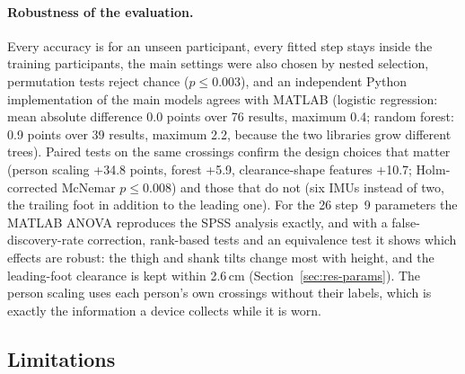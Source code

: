 \paragraph{Robustness of the evaluation.} Every accuracy is for an unseen participant, every fitted step stays inside the training
participants, the main settings were also chosen by nested selection, permutation tests reject chance ($p \leq 0.003$), and an
independent Python implementation of the main models agrees with MATLAB (logistic regression: mean absolute difference 0.0 points
over 76 results, maximum 0.4; random forest: 0.9 points over 39 results, maximum 2.2, because the two libraries grow different
trees). Paired tests on the same crossings confirm the design choices that matter (person scaling +34.8 points, forest +5.9,
clearance-shape features +10.7; Holm-corrected McNemar $p \leq 0.008$) and those that do not (six IMUs instead of two, the trailing
foot in addition to the leading one). For the 26 step~9 parameters the MATLAB ANOVA reproduces the SPSS analysis exactly, and with a
false-discovery-rate correction, rank-based tests and an equivalence test it shows which effects are robust: the thigh and shank tilts
change most with height, and the leading-foot clearance is kept within 2.6\,cm (Section~\ref{sec:res-params}). The person scaling uses
each person's own crossings
without their labels, which is exactly the information a device collects while it is worn.



\subsection{Limitations}
\label{sec:limitations}

